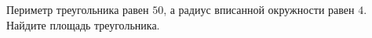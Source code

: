 \begin{ex}
	\begin{condition}
		Периметр треугольника равен \( 50 \), а радиус вписанной окружности равен \( 4 \). Найдите площадь треугольника.
	\end{condition}
\end{ex}